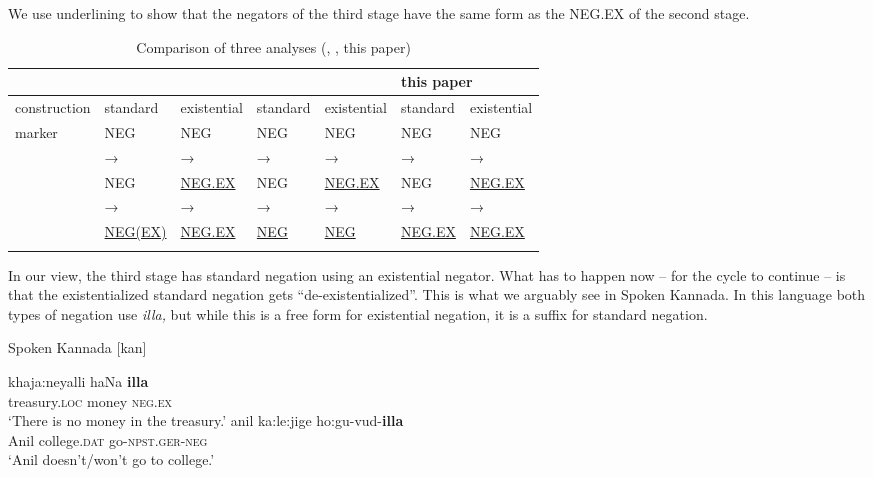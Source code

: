 ﻿\documentclass[output=paper]{langsci/langscibook}
\begin{document}
We use underlining to show that the negators of the third stage have the same
form as the NEG.EX of the second stage.
%
\begin{table}\begin{footnotesize}
\begin{tabularx}{\textwidth}{l l l l l l l}
\lsptoprule
&\multicolumn{2}{l}{\cite{Croft1991}}&\multicolumn{2}{l}{\cite{Veselinova2014}}&\multicolumn{2}{l}{this
paper}\\\midrule
construction & standard & existential & standard & existential & standard &
existential\\\midrule
marker  &NEG        &NEG        &NEG        &NEG        &NEG        &NEG\\
        &→          &→          &→          &→          &→          &→\\
        &NEG        &\underline{NEG.EX}     &NEG        &\underline{NEG.EX}
        &NEG &\underline{NEG.EX}\\
        &→          &→          &→          &→          &→          &→\\
        &\underline{NEG(EX)}    &\underline{NEG.EX}     &\underline{NEG}
        &\underline{NEG}     &\underline{NEG.EX} &\underline{NEG.EX}\\
\lspbottomrule
\end{tabularx}\end{footnotesize}
\caption{Comparison of three analyses (\citealt{Croft1991}, \citealt{Veselinova2014}, this paper)}
\label{tab:int-three-analyses}
\end{table}
%
In our view, the third stage has standard negation using an existential
negator. What has to happen now -- for the cycle to continue -- is that the
existentialized standard negation gets ``de-existentialized''. This is what
we arguably see in Spoken Kannada. In this language both types of negation
use \textit{illa,} but while this is a free form for existential negation,
it is a suffix for standard negation.
%
\begin{exe}\ex\label{ex:int-kannada-money-college}
           Spoken Kannada [kan] 
    \begin{xlist}
    \ex\label{ex:int-kannada-money}
    \gll khaja:neyalli    haNa    \textbf{illa} \\
    treasury.\textsc{loc}    money  \textsc{neg.ex} \\
    \glt `There is no money in the treasury.'
    \ex\label{ex:int-kannada-college}
    \gll anil  ka:le:jige  ho:gu-vud-\textbf{illa}\\
    Anil  college.\textsc{dat}  go-\textsc{npst.ger-neg}\\
    \glt `Anil doesn't/won't go to college.'
    \end{xlist}\end{exe}
\end{document}
